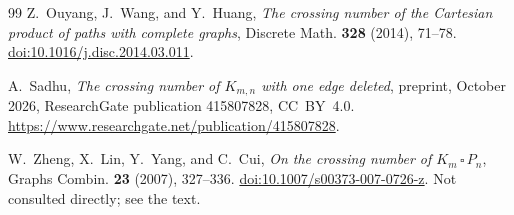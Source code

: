 \documentclass[11pt,a4paper]{article}
\newcommand{\doi}[1]{\href{https://doi.org/#1}{doi:#1}}
\theoremstyle{definition}
\theoremstyle{remark}
\numberwithin{equation}{section}
\begin{document}
\begin{thebibliography}{99}
Z.~Ouyang, J.~Wang, and Y.~Huang,
\emph{The crossing number of the Cartesian product of paths with complete graphs},
Discrete Math. \textbf{328} (2014), 71--78.
\doi{10.1016/j.disc.2014.03.011}.

A.~Sadhu,
\emph{The crossing number of $K_{m,n}$ with one edge deleted},
preprint, October 2026, ResearchGate publication 415807828, CC~BY~4.0.
\url{https://www.researchgate.net/publication/415807828}.

W.~Zheng, X.~Lin, Y.~Yang, and C.~Cui,
\emph{On the crossing number of $K_m\,\square\,P_n$},
Graphs Combin. \textbf{23} (2007), 327--336.
\doi{10.1007/s00373-007-0726-z}.
Not consulted directly; see the text.

\end{thebibliography}
\endgroup
\end{document}
